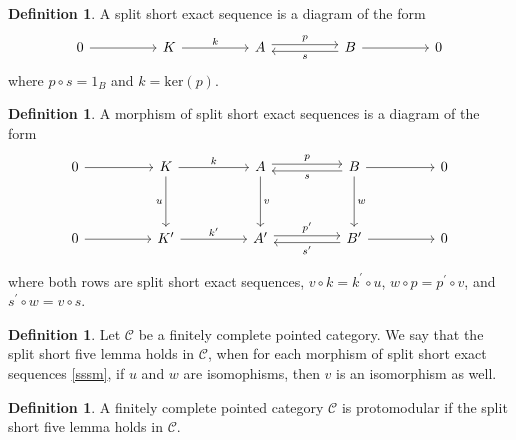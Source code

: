 \documentclass{amsart}
\theoremstyle{definition}
\newtheorem{definition}[theorem]{Definition}
\newenvironment{invisible}{{\noindent\sc \colorbox{yellow}{Invisible:}\;}\color{gray}}{\medskip}
\begin{document}
\begin{invisible}
\begin{definition}
A split short exact sequence is a diagram of the form 
$$
\begin{tikzcd}[ampersand replacement=\&]
	0 \&\& K \&\& A \&\& B \&\& 0
	\arrow[from=1-1, to=1-3]
	\arrow["k", from=1-3, to=1-5]
	\arrow["p", shift left, from=1-5, to=1-7]
	\arrow["s", shift left, from=1-7, to=1-5]
	\arrow[from=1-7, to=1-9]
\end{tikzcd}
$$
where $p \circ s = 1_B$ and $k =\mathrm{ker}(p)$.
\end{definition}

\begin{definition}
A morphism of split short exact sequences is a diagram of the form
\begin{align} \label{sssm}
\begin{tikzcd}[ampersand replacement=\&]
	0 \&\& K \&\& A \&\& B \&\& 0 \\
	\\
	0 \&\& {K^\prime} \&\& {A^\prime} \&\& {B^\prime} \&\& 0
	\arrow[from=1-1, to=1-3]
	\arrow["k", from=1-3, to=1-5]
	\arrow["u"', from=1-3, to=3-3]
	\arrow["p", shift left, from=1-5, to=1-7]
	\arrow["v", from=1-5, to=3-5]
	\arrow["s", shift left, from=1-7, to=1-5]
	\arrow[from=1-7, to=1-9]
	\arrow["w", from=1-7, to=3-7]
	\arrow[from=3-1, to=3-3]
	\arrow["{k^\prime}", from=3-3, to=3-5]
	\arrow["{p^\prime}", shift left, from=3-5, to=3-7]
	\arrow["{s^\prime}", shift left, from=3-7, to=3-5]
	\arrow[from=3-7, to=3-9]
\end{tikzcd}
\end{align}

where both rows are split short exact sequences, $v \circ k=k^\prime \circ u$, $w \circ p= p^\prime \circ v$, and $s^\prime \circ w = v \circ s$.
\end{definition}

\begin{definition}
Let $\mathcal{C}$ be a finitely complete pointed category. We say that the split short five lemma holds in $\mathcal{C}$, when for each morphism of split short exact sequences \eqref{sssm}, if $u$ and $w$ are isomophisms, then $v$ is an isomorphism as well. 
\end{definition}

\begin{definition}
A finitely complete pointed category $\mathcal{C}$ is protomodular if the split short five lemma holds in $\mathcal{C}$.    
\end{definition}


\end{invisible}
\end{document}
